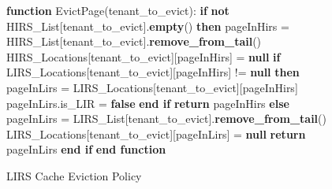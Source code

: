 \begin{figure}[htbp]
\begin{minipage}{\linewidth}
\begin{algorithm}[H]
\begin{algorithmic}
            \STATE
            \STATE \textbf{function} EvictPage(tenant\_to\_evict):
            \STATE \hspace{\algorithmicindent} \textbf{if} \textbf{not} HIRS\_List[tenant\_to\_evict].\textbf{empty}() \textbf{then}
            \STATE \hspace{\algorithmicindent} \hspace{\algorithmicindent} pageInHirs = HIRS\_List[tenant\_to\_evict].\textbf{remove\_from\_tail}()
            \STATE \hspace{\algorithmicindent} \hspace{\algorithmicindent} HIRS\_Locations[tenant\_to\_evict][pageInHirs] = \textbf{null}
            \STATE \hspace{\algorithmicindent} \hspace{\algorithmicindent} \textbf{if} LIRS\_Locations[tenant\_to\_evict][pageInHirs] != \textbf{null} \textbf{then}
            \STATE \hspace{\algorithmicindent} \hspace{\algorithmicindent} \hspace{\algorithmicindent} pageInLirs = LIRS\_Locations[tenant\_to\_evict][pageInHirs]
            \STATE \hspace{\algorithmicindent} \hspace{\algorithmicindent} \hspace{\algorithmicindent} pageInLirs.is\_LIR = \textbf{false}
            \STATE \hspace{\algorithmicindent} \hspace{\algorithmicindent} \textbf{end if}
            \STATE \hspace{\algorithmicindent} \hspace{\algorithmicindent} \textbf{return} pageInHirs
            \STATE \hspace{\algorithmicindent} \textbf{else}
            \STATE \hspace{\algorithmicindent} \hspace{\algorithmicindent} pageInLirs = LIRS\_List[tenant\_to\_evict].\textbf{remove\_from\_tail}()
            \STATE \hspace{\algorithmicindent} \hspace{\algorithmicindent} LIRS\_Locations[tenant\_to\_evict][pageInLirs] = \textbf{null}
            \STATE \hspace{\algorithmicindent} \hspace{\algorithmicindent} \textbf{return} pageInLirs
            \STATE \hspace{\algorithmicindent} \textbf{end if}
            \STATE \textbf{end function}
        \end{algorithmic}
    \end{algorithm}
    \caption{LIRS Cache Eviction Policy}
    \label{fig:lirs}
    \end{minipage}
\end{figure}

